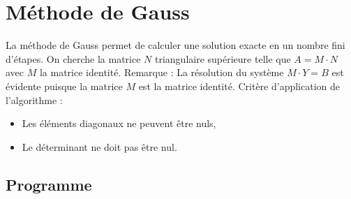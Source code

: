 \documentclass{report}
\begin{document}
    \section{Méthode de Gauss}
      La méthode de Gauss permet de calculer une solution exacte en un nombre fini d'étapes.
      \newline
      On cherche la matrice $N$ triangulaire supérieure telle que $A = M \cdot N$ avec $M$ la matrice identité.
      \newline
      Remarque : La résolution du système $M \cdot Y = B$ est évidente puisque la matrice $M$ est la matrice identité.
      \newline
      Critère d'application de l'algorithme :
      \begin{itemize}
        \item{Les éléments diagonaux ne peuvent être nuls,}
        \item{Le déterminant ne doit pas être nul.}
      \end{itemize}
        \lstset{language=C,showstringspaces=false}
      \subsection{Programme}
        
      \newpage
\end{document}

